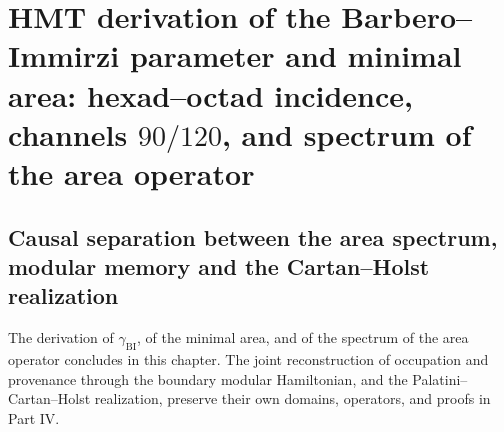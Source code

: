 \chapter{HMT derivation of the Barbero--Immirzi parameter and minimal area:
hexad--octad incidence, channels \(90/120\), and spectrum of the area
operator}
\label{chap:p3-final:51:barbero_area}






\section{Causal separation between the area spectrum, modular memory and the Cartan--Holst realization}
The derivation of $\gamma_{\mathrm{BI}}$, of the minimal area, and of the spectrum of the area operator concludes in this chapter. The joint reconstruction of occupation and provenance through the boundary modular Hamiltonian, and the Palatini--Cartan--Holst realization, preserve their own domains, operators, and proofs in Part IV.
